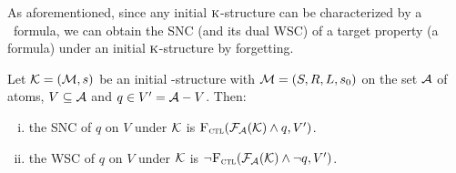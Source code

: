 \documentclass[letterpaper]{article} %
\begin{document}
As aforementioned, since any initial $\textsc{k}$-structure can be characterized by a \CTL\ formula, we can obtain the SNC (and its dual WSC) of a target property (a formula) under an initial $\textsc{k}$-structure by forgetting.
\begin{theorem}\label{thm:inK:SNC}
Let ${\cal K}= ({\cal M}, s)$ be an initial \MPK-structure with ${\cal M}=(S,R,L,s_0)$ on the set ${\cal A}$ of atoms, $V \subseteq {\cal A}$ and $q\in V' = {\cal A} - V$. Then:
 \begin{enumerate}[(i)]
   \item the SNC of $q$ on $V$ under ${\cal K}$ is ${\textsc{F}_{\textsc{ctl}}}({\cal F}_{{\cal A}}({\cal K}) \wedge q, V')$.
   \item the WSC of $q$ on $V$ under ${\cal K}$ is $\neg {\textsc{F}_{\textsc{ctl}}}({\cal F}_{{\cal A}}({\cal K}) \wedge \neg q, V')$.
 \end{enumerate}
\end{theorem}
%
\end{document}

